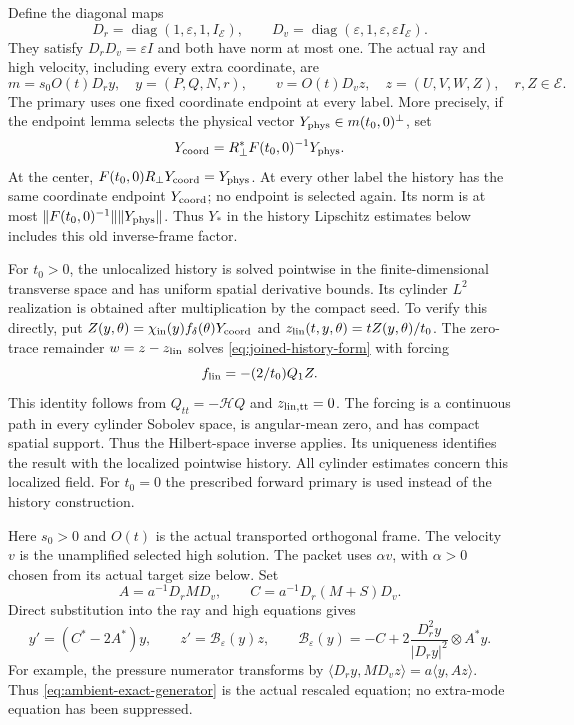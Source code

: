 Define the diagonal maps
\[
 D_r=\operatorname{diag}(1,\varepsilon,1,I_{\mathcal E}),\qquad
 D_v=\operatorname{diag}(\varepsilon,1,\varepsilon,
                                      \varepsilon I_{\mathcal E}).
\]
They satisfy $D_rD_v=\varepsilon I$ and both have norm at most one.
The actual ray and high velocity, including every extra coordinate, are
\begin{equation}\label{eq:ambient-scaled-states}
 m=s_0 O(t)D_r y,\quad y=(P,Q,N,r),\qquad
 v=O(t)D_v z,\quad z=(U,V,W,Z),\quad r,Z\in\mathcal E.
\end{equation}
The primary uses one fixed coordinate endpoint at every label.
More precisely, if the endpoint lemma selects the physical vector
$Y_{\rm phys}\in m(t_0,0)^\perp$, set
\[
 Y_{\rm coord}=R_\perp^*F(t_0,0)^{-1}Y_{\rm phys}.
\]
At the center, $F(t_0,0)R_\perp Y_{\rm coord}=Y_{\rm phys}$.
At every other label the history has the same coordinate endpoint
$Y_{\rm coord}$; no endpoint is selected again. Its norm is at most
$\|F(t_0,0)^{-1}\|\|Y_{\rm phys}\|$. Thus $Y_*$ in the history
Lipschitz estimates below includes this old inverse-frame factor.

For $t_0>0$, the unlocalized history is solved pointwise in the finite-dimensional
transverse space and has uniform spatial derivative bounds. Its
cylinder $L^2$ realization is obtained after multiplication by the
compact seed. To verify this directly, put
$Z(y,\theta)=\chi_{\rm in}(y)f_\delta(\theta)Y_{\rm coord}$
and $z_{\rm lin}(t,y,\theta)=tZ(y,\theta)/t_0$.
The zero-trace remainder $w=z-z_{\rm lin}$ solves
\eqref{eq:joined-history-form} with forcing
\[
 f_{\rm lin}=-(2/t_0)Q_1Z.
\]
This identity follows from $Q_{tt}=-\mathcal HQ$ and
$z_{\rm lin,tt}=0$. The forcing is a continuous path in every
cylinder Sobolev space, is angular-mean zero, and has compact spatial
support. Thus the Hilbert-space inverse applies. Its uniqueness
identifies the result with the localized pointwise history. All
cylinder estimates concern this localized field. For $t_0=0$ the
prescribed forward primary is used instead of the history construction.

Here $s_0>0$ and $O(t)$ is the actual transported orthogonal frame.
The velocity $v$ is the unamplified selected high solution. The packet
uses $\alpha v$, with $\alpha>0$ chosen from its actual target size below.
Set
\[
 A=a^{-1}D_rMD_v,\qquad C=a^{-1}D_r(M+S)D_v .
\]
Direct substitution into the ray and high equations gives
\begin{equation}\label{eq:ambient-exact-generator}
 y'=(C^*-2A^*)y,\qquad
 z'=\mathscr B_\varepsilon(y)z,\qquad
 \mathscr B_\varepsilon(y)
  =-C+2\frac{D_r^2y}{|D_ry|^2}\otimes A^*y .
\end{equation}
For example, the pressure numerator transforms by
$\langle D_ry,MD_vz\rangle=a\langle y,Az\rangle$.
Thus \eqref{eq:ambient-exact-generator} is the actual rescaled equation;
no extra-mode equation has been suppressed.

